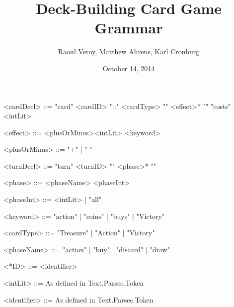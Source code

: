\documentclass{article}
\title{Deck-Building Card Game Grammar}
\author{Raoul Veroy, Matthew Ahrens, Karl Cronburg}
\date{October 14, 2014}
\begin{document}
\maketitle
\thispagestyle{empty}

\begin{grammar}

<cardDecl>    ::= "card" <cardID> "::" <cardType> "{" <effect>* "}" "costs" <intLit>

<effect>      ::= <plusOrMinus><intLit> <keyword>

<plusOrMinus> ::= "+" | "-"


<turnDecl> ::= "turn" <turnID> "{" <phase>* "}"

<phase>     ::= <phaseName> <phaseInt>

<phaseInt>  ::= <intLit> | "all"

<keyword>     ::= "action"   | "coins"  | "buys"    | "Victory"

<cardType>    ::= "Treasure" | "Action" | "Victory"

<phaseName>   ::= "action"   | "buy"    | "discard" | "draw"

<*ID>         ::= <identifier>

<intLit>      ::= As defined in Text.Parsec.Token

<identifier>  ::= As defined in Text.Parsec.Token

%
%
%
%
\end{grammar}
\end{document}
